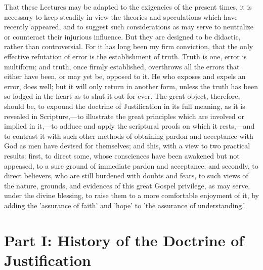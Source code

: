 \documentclass[
]{book}
\begin{document}
That these Lectures may be adapted to the exigencies of the present times, it is necessary to keep steadily in view the theories and speculations which have recently appeared, and to suggest such considerations as may serve to neutralize or counteract their injurious influence. But they are designed to be didactic, rather than controversial. For it has long been my firm conviction, that the only effective refutation of error is the establishment of truth. Truth is one, error is multiform; and truth, once firmly established, overthrows all the errors that either have been, or may yet be, opposed to it. He who exposes and expels an error, does well; but it will only return in another form, unless the truth has been so lodged in the heart as to shut it out for ever. The great object, therefore, should be, to expound the doctrine of Justification in its full meaning, as it is revealed in Scripture,---to illustrate the great principles which are involved or implied in it,---to adduce and apply the scriptural proofs on which it rests,---and to contrast it with such other methods of obtaining pardon and acceptance with God as men have devised for themselves; and this, with a view to two practical results: first, to direct some, whose consciences have been awakened but not appeased, to a sure ground of immediate pardon and acceptance; and secondly, to direct believers, who are still burdened with doubts and fears, to such views of the nature, grounds, and evidences of this great Gospel privilege, as may serve, under the divine blessing, to raise them to a more comfortable enjoyment of it, by adding the 'assurance of faith' and 'hope' to 'the assurance of understanding.'

\hypertarget{part-i-history-of-the-doctrine-of-justification}{%
\chapter{Part I: History of the Doctrine of Justification}\label{part-i-history-of-the-doctrine-of-justification}}
\end{document}

